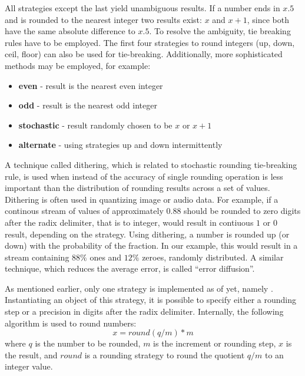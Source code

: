 
All strategies except the last yield unambiguous results.
If a number ends in $x.5$ and is rounded to the nearest integer two results exist: $x$ and $x+1$, since both have the same absolute difference to $x.5$.
To resolve the ambiguity, tie breaking rules have to be employed.
The first four strategies to round integers (up, down, ceil, floor) can also be used for tie-breaking.
Additionally, more sophisticated methods may be employed, for example:

\begin{itemize}
\item{\textbf{even} - result is the nearest even integer}
\item{\textbf{odd} - result is the nearest odd integer}
\item{\textbf{stochastic} - result randomly chosen to be $x$ or $x+1$}
\item{\textbf{alternate} - using strategies up and down intermittently}
\end{itemize}

A technique called dithering, which is related to stochastic rounding tie-breaking rule, is used when instead of the accuracy of single rounding operation is less important than the distribution of rounding results across a set of values.
Dithering is often used in quantizing image or audio data.
For example, if a continous stream of values of approximately $0.88$ should be rounded to zero digits after the radix delimiter, that is to integer, would result in contiuous $1$ or $0$ result, depending on the strategy.
Using dithering, a number is rounded up (or down) with the probability of the fraction.
In our example, this would result in a stream containing $88\%$ ones and $12\%$ zeroes, randomly distributed.
A similar technique, which reduces the average error, is called ``error diffusion''.

As mentioned earlier, only one strategy is implemented as of yet, namely .
Instantiating an object of this strategy, it is possible to specify either a rounding step or a precision in digits after the radix delimiter.
Internally, the following algorithm is used to round numbers:
\begin{equation*}
x = round(q/m) * m
\end{equation*}
where $q$ is the number to be rounded, $m$ is the increment or rounding step, $x$ is the result, and $round$ is a rounding strategy to round the quotient $q/m$ to an integer value.

